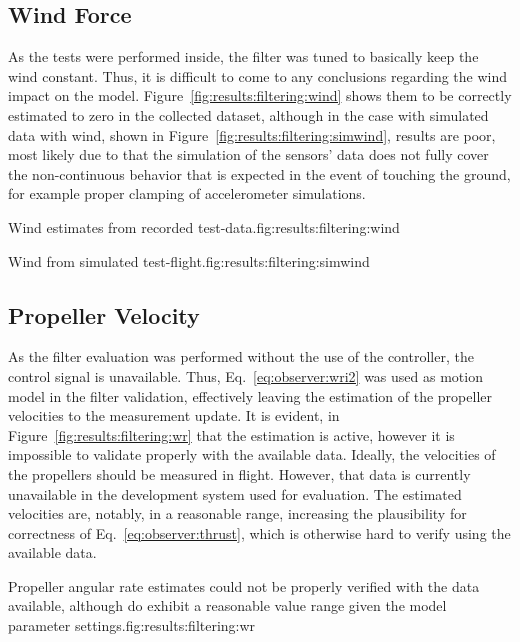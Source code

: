 \subsection{Wind Force}
    As the tests were performed inside, the filter was tuned to basically keep the
    wind constant. Thus, it is difficult to come to any conclusions regarding the
    wind impact on the model. Figure~\ref{fig:results:filtering:wind}
    shows them to be correctly estimated to zero in the collected dataset,
    although in the case with simulated data with wind, shown in Figure~\ref{fig:results:filtering:simwind},
    results are poor, most likely due to that the simulation of the sensors' data
    does not fully cover the non-continuous behavior that is expected in the
    event of touching the ground, for example proper clamping of accelerometer simulations.

    \begin{subfigures}{Wind estimates from recorded test-data.}{fig:results:filtering:wind}
    \end{subfigures}

    \begin{subfigures}{Wind from simulated test-flight.}{fig:results:filtering:simwind}
    \end{subfigures}


\subsection{Propeller Velocity}
    As the filter evaluation was performed without the use of the controller,
    the control signal is unavailable. Thus, Eq.~\ref{eq:observer:wri2} was used as
    motion model in the filter validation, effectively leaving the estimation of the propeller velocities
    to the measurement update. It is evident, in Figure~\ref{fig:results:filtering:wr}
    that the estimation is active, however it is impossible to validate properly with the available data.
    Ideally, the velocities of the propellers should be measured in flight.
    However, that data is currently unavailable in the development system used for evaluation.
    The estimated velocities are, notably, in a reasonable range,
    increasing the plausibility for correctness of Eq.~\ref{eq:observer:thrust}, which is
    otherwise hard to verify using the available data.

    \begin{subfigures}{Propeller angular rate estimates could not be properly verified with the data available, although do exhibit a reasonable value range given the model parameter settings.}{fig:results:filtering:wr}
    \end{subfigures}
